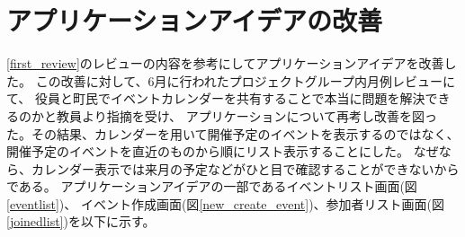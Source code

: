 \section{アプリケーションアイデアの改善}
\ref{first_review}のレビューの内容を参考にしてアプリケーションアイデアを改善した。
この改善に対して、6月に行われたプロジェクトグループ内月例レビューにて、
役員と町民でイベントカレンダーを共有することで本当に問題を解決できるのかと教員より指摘を受け、
アプリケーションについて再考し改善を図った。その結果、カレンダーを用いて開催予定のイベントを表示するのではなく、
開催予定のイベントを直近のものから順にリスト表示することにした。
なぜなら、カレンダー表示では来月の予定などがひと目で確認することができないからである。
アプリケーションアイデアの一部であるイベントリスト画面(図\ref{eventlist})、
イベント作成画面(図\ref{new_create_event})、参加者リスト画面(図\ref{joinedlist})を以下に示す。

